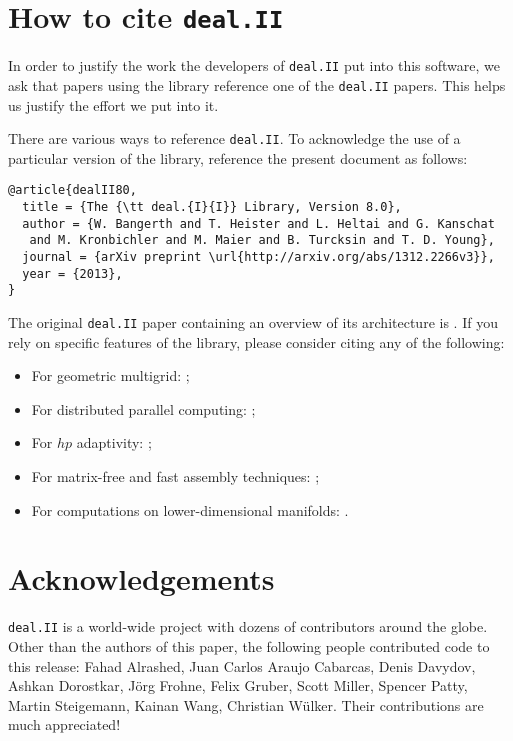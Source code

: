 \documentclass{siamltex}
\newcommand{\specialword}[1]{\texttt{#1}}
\newcommand{\dealii}{{\specialword{deal.II}}}
\begin{document}
\section{How to cite \dealii{}}\label{sec:cite}

In order to justify the work the developers of \dealii{} put into this
software, we ask that papers using the library reference one of the \dealii{}
papers. This helps us justify the effort we put into it.

There are various ways to reference \dealii{}. To acknowledge the use of a
particular version of the library, reference the present document as follows:
\begin{verbatim}
@article{dealII80,
  title = {The {\tt deal.{I}{I}} Library, Version 8.0},
  author = {W. Bangerth and T. Heister and L. Heltai and G. Kanschat
   and M. Kronbichler and M. Maier and B. Turcksin and T. D. Young},
  journal = {arXiv preprint \url{http://arxiv.org/abs/1312.2266v3}},
  year = {2013},
}
\end{verbatim}

The original \texttt{\dealii{}} paper containing an overview of its
architecture is \cite{BangerthHartmannKanschat2007}. If you rely on specific
features of the library, please consider citing any of the following:
\begin{itemize}
 \item For geometric multigrid: \cite{Kanschat2004,JanssenKanschat2011};
 \item For distributed parallel computing: \cite{BangerthBursteddeHeisterKronbichler11};
 \item For $hp$ adaptivity: \cite{BangerthKayserHerold2007};
 \item For matrix-free and fast assembly techniques:
   \cite{KronbichlerKormann2012};
 \item For computations on lower-dimensional manifolds:
   \cite{DeSimoneHeltaiManigrasso2009}.
\end{itemize}


\nocite{BangerthKanschat1999}

\section{Acknowledgements}

\dealii{} is a world-wide project with dozens of contributors around the
globe. Other than the authors of this paper, the following people contributed code to
this release: 
  Fahad Alrashed,
  Juan Carlos Araujo Cabarcas,
  Denis Davydov,
  Ashkan Dorostkar,
  J{\"o}rg Frohne,
  Felix Gruber,
  Scott Miller,
  Spencer Patty,
  Martin Steigemann,
  Kainan Wang,
  Christian W{\"u}lker.
Their contributions are much appreciated!
\end{document}
